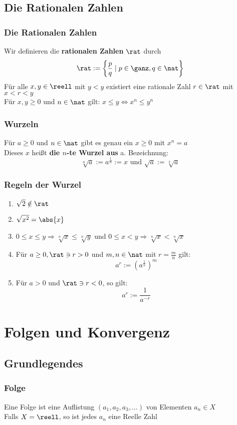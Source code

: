 \documentclass{kit}
\begin{document}
  \subsection{Die Rationalen Zahlen}
    \subsubsection{Die Rationalen Zahlen}
      Wir definieren die \textbf{rationalen Zahlen} $\rat$ durch
      $$\rat:=\left\{\frac{p}{q}\mid p\in\ganz,q\in\nat\right\}$$
      Für alle $x,y\in\reell$ mit $y<y$ existiert eine rationale Zahl $r\in\rat$ mit $x<r<y$\\
      Für $x,y\ge0$ und $n\in\nat$ gilt: $x\le y\Longleftrightarrow x^n\le y^n$
    \subsubsection{Wurzeln}
      Für $a\ge0$ und $n\in\nat$ gibt es genau ein $x\ge0$ mit $x^n=a$\\
      Dieses $x$ heißt \textbf{die $n$-te Wurzel aus} a. Bezeichnung:
      $$\sqrt[n]{a}:=a^{\frac{1}{n}}:=x\text{ und } \sqrt{a}:=\sqrt[2]{a}$$
    \subsubsection{Regeln der Wurzel}
      \begin{enumerate}
        \item $\sqrt{2}\notin\rat$
        \item $\sqrt{x^2}=\abs{x}$
        \item $0\le x\le y\Rightarrow\sqrt[n]{x}\le\sqrt[n]{y}$ und $0\le x< y\Rightarrow\sqrt[n]x<\sqrt[n]{x}$
        \item Für $a\ge0,\rat\ni r>0$ und $m,n\in\nat$ mit $r=\frac{m}{n}$ gilt:
          $$a^r:=\left(a^{\frac{1}{n}}\right)^m$$
        \item Für $a>0$ und $\rat\ni r<0$, so gilt:
          $$a^r:=\frac{1}{a^{-r}}$$
      \end{enumerate}
\section{Folgen und Konvergenz}
  \subsection{Grundlegendes}
    \subsubsection{Folge}
      Eine Folge ist eine Auflistung $(a_1,a_2,a_3,\dots)$ von Elementen $a_n\in X$\\
      Falls $X=\reell$, so ist jedes $a_n$ eine Reelle Zahl
\end{document}
